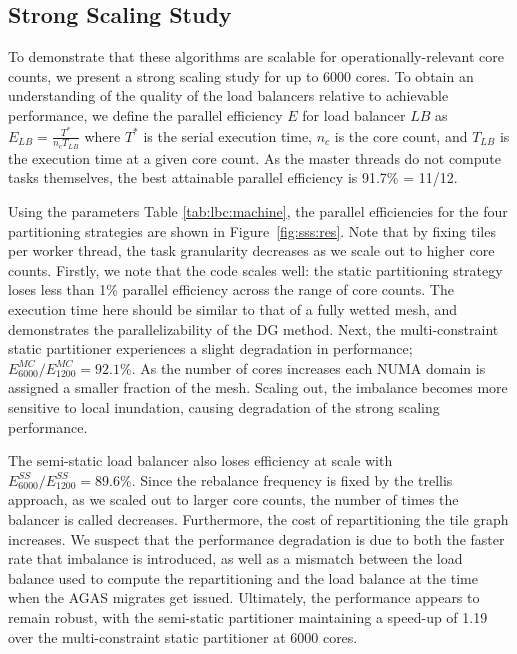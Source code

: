\subsection{Strong Scaling Study}
To demonstrate that these algorithms are scalable for operationally-relevant core counts, we present a strong scaling study for up to 6000 cores. 
To obtain an understanding of the quality of the load balancers relative to achievable performance, we define the parallel efficiency $E$ for load balancer $LB$ as $E_{LB} = \frac{ T^*}{n_c T_{LB}}$ where $T^*$ is the serial execution time, $n_c$ is the core count, and $T_{LB}$ is the execution time at a given core count. As the master threads do not compute tasks themselves, the best attainable parallel efficiency is 91.7\% = 11/12.

Using the parameters Table \ref{tab:lbc:machine}, the parallel efficiencies for the four partitioning strategies are shown in Figure~\ref{fig:sss:res}. Note that by fixing  tiles per worker thread, the task granularity decreases as we scale out to higher core counts.
Firstly, we note that the code scales well: the static partitioning strategy loses less than 1\% parallel efficiency across the range of core counts. The execution time here should be similar to that of a fully wetted mesh, and demonstrates the parallelizability of the DG method. Next, the multi-constraint static partitioner experiences a slight degradation in performance; $E^{MC}_{6000}/E^{MC}_{1200} = 92.1 \%$. As the number of cores increases each NUMA domain is assigned a smaller fraction of the mesh. Scaling out, the imbalance becomes more sensitive to local inundation, causing degradation of the strong scaling performance.

The semi-static load balancer also loses efficiency at scale with $E^{SS}_{6000}/E^{SS}_{1200}=89.6\%$. Since the rebalance frequency is fixed by the trellis approach, as we scaled out to larger core counts, the number of times the balancer is called decreases. Furthermore, the cost of repartitioning the tile graph increases.  We suspect that the performance degradation is due to both the faster rate that imbalance is introduced, as well as a mismatch between the load balance used to compute the repartitioning and the load balance at the time when the AGAS migrates get issued. %
 Ultimately, the performance appears to remain robust, with the semi-static partitioner maintaining a speed-up of 1.19 over the multi-constraint static partitioner at 6000 cores.

